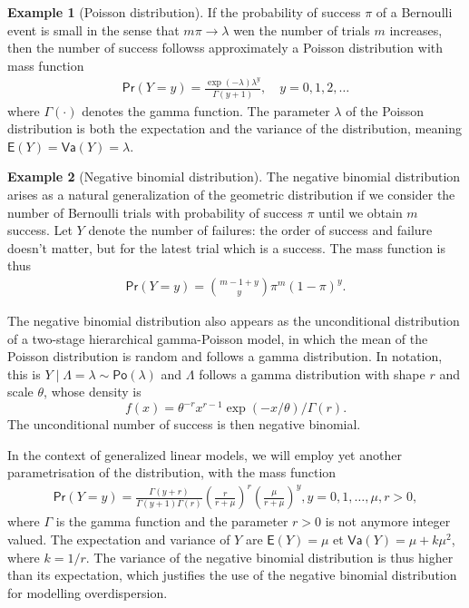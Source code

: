 \documentclass[
  11pt,
  letterpaper,
]{book}
\theoremstyle{definition}
\theoremstyle{definition}
\newtheorem{example}{Example}[chapter]
\theoremstyle{definition}
\theoremstyle{remark}
\begin{document}
\begin{example}[Poisson distribution]
\protect\hypertarget{exm:poissondist}{}{\label{exm:poissondist} {} }If the probability of success \(\pi\) of a Bernoulli event is small in the sense that \(m\pi \to \lambda\) wen the number of trials \(m\) increases, then the number of success followss approximately a Poisson distribution with mass function
\begin{align*}
\mathsf{Pr}(Y=y) = \frac{\exp(-\lambda)\lambda^y}{\Gamma(y+1)}, \quad y=0, 1, 2, \ldots
\end{align*}
where \(\Gamma(\cdot)\) denotes the gamma function. The parameter \(\lambda\) of the Poisson distribution is both the expectation and the variance of the distribution, meaning \(\mathsf{E}(Y)=\mathsf{Va}(Y)=\lambda\).
\end{example}

\begin{example}[Negative binomial distribution]
\protect\hypertarget{exm:negbindist}{}{\label{exm:negbindist} {} }The negative binomial distribution arises as a natural generalization of the geometric distribution if we consider the number of Bernoulli trials with probability of success \(\pi\) until we obtain \(m\) success. Let \(Y\) denote the number of failures: the order of success and failure doesn't matter, but for the latest trial which is a success. The mass function is thus
\begin{align*}
\mathsf{Pr}(Y=y)= \binom{m-1+y}{y} \pi^m (1-\pi)^{y}.
\end{align*}

The negative binomial distribution also appears as the unconditional distribution of a two-stage hierarchical gamma-Poisson model, in which the mean of the Poisson distribution is random and follows a gamma distribution. In notation, this is \(Y \mid \Lambda=\lambda \sim \mathsf{Po}(\lambda)\) and \(\Lambda\) follows a gamma distribution with shape \(r\) and scale \(\theta\), whose density is \[f(x) = \theta^{-r}x^{r-1}\exp(-x/\theta)/\Gamma(r).\] The unconditional number of success is then negative binomial.

In the context of generalized linear models, we will employ yet another parametrisation of the distribution, with the mass function
\begin{align*}
\mathsf{Pr}(Y=y)=\frac{\Gamma(y+r)}{\Gamma(y+1)\Gamma(r)} \left(\frac{r}{r + \mu} \right)^{r} \left(\frac{\mu}{r+\mu}\right)^y, y=0, 1, \ldots, \mu,r >0,
\end{align*}
where \(\Gamma\) is the gamma function and the parameter \(r>0\) is not anymore integer valued. The expectation and variance of \(Y\) are
\(\mathsf{E}(Y)=\mu\) et \(\mathsf{Va}(Y)=\mu+k\mu^2\), where \(k=1/r\). The variance of the negative binomial distribution is thus higher than its expectation, which justifies the use of the negative binomial distribution for modelling overdispersion.
\end{example}
\end{document}
